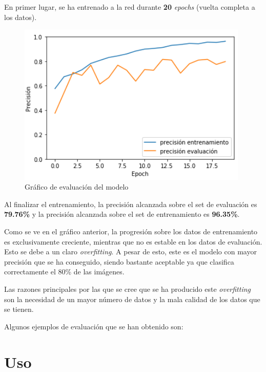 \documentclass{uc3mpracticas}
\begin{document}
  En primer lugar, se ha entrenado a la red durante \textbf{20} \textit{epochs} (vuelta completa a los datos).

  \begin{figure}[H]
    \centering
    \includegraphics[width=110mm]{Images/evaluacion.png}
    \caption{Gráfico de evaluación del modelo}
  \end{figure}


  Al finalizar el entrenamiento, la precisión alcanzada sobre el set de evaluación es \textbf{79.76\%} y la precisión alcanzada sobre el set de entrenamiento es \textbf{96.35\%}.

  \vspace{2mm}

  Como se ve en el gráfico anterior, la progresión sobre los datos de entrenamiento es exclusivamente creciente, mientras que no es estable en los datos de evaluación. Esto se debe a un claro \textit{overfitting}. A pesar de esto, este es el modelo con mayor precisión que se ha conseguido, siendo bastante aceptable ya que clasifica correctamente el 80\% de las imágenes.

  \vspace{2mm}

  Las razones principales por las que se cree que se ha producido este \textit{overfitting} son la necesidad de un mayor número de datos y la mala calidad de los datos que se tienen.

  \vspace{3mm}

  Algunos ejemplos de evaluación que se han obtenido son:


  \newpage
  \section{Uso}
\end{document}
